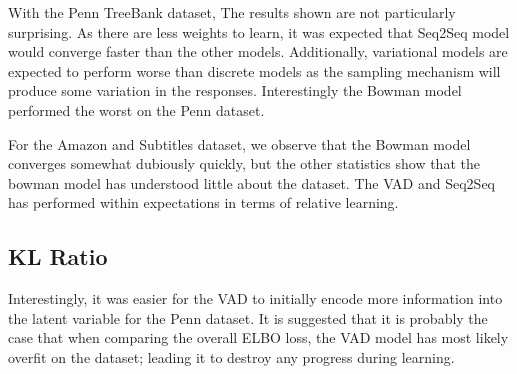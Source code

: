 \documentclass[12pt,twoside]{report}
\begin{document}
With the Penn TreeBank dataset, The results shown are not particularly surprising. As there are less weights to learn, it was expected that Seq2Seq model would converge faster than the other models. Additionally, variational models are expected to perform worse than discrete models as the sampling mechanism will produce some variation in the responses. Interestingly the Bowman model performed the worst on the Penn dataset.

For the Amazon and Subtitles dataset, we observe that the Bowman model converges somewhat dubiously  quickly, but the other statistics show that the bowman model has understood little about the dataset. The VAD and Seq2Seq has performed within expectations in terms of relative learning.


	


\subsection{KL Ratio}

Interestingly, it was easier for the VAD to initially encode more information into the latent variable for the Penn dataset. It is suggested that it is probably the case that when comparing the overall ELBO loss, the VAD model has most likely overfit on the dataset; leading it to destroy any progress during learning.
\end{document}
